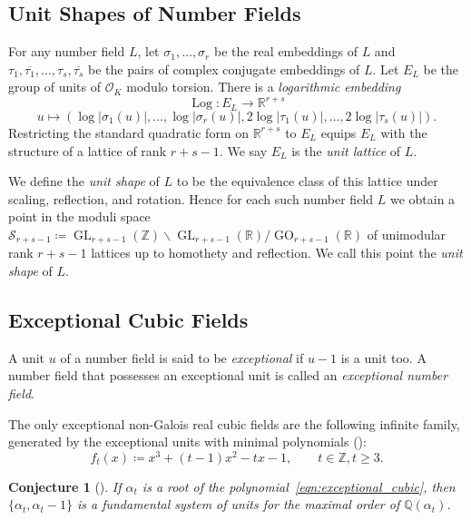 \documentclass[11pt]{amsart}
\numberwithin{equation}{section}
\newtheorem{conjecture}[algorithm]{Conjecture}
\theoremstyle{definition}
\newcommand{\RR}{\mathbb{R}}
\newcommand{\ZZ}{\mathbb{Z}}
\newcommand{\QQ}{\mathbb{Q}}
\newcommand{\cO}{\mathcal{O}}
\DeclareMathOperator{\Log}{Log}
\DeclareMathOperator{\GO}{GO}
\DeclareMathOperator{\GL}{GL}
\begin{document}
\subsection{Unit Shapes of Number Fields}

For any number field $L$, let $\sigma_1,\dots,\sigma_r$ be the real embeddings of $L$ and $\tau_1, \overline{\tau_1},\dots, \tau_s, \overline{\tau_s}$ be the pairs of complex conjugate embeddings of $L$. Let $E_L$ be the group of units of $\cO_K$ modulo torsion. There is a \emph{logarithmic embedding}
\[
    \Log \colon E_L		  	\longrightarrow \RR^{r + s}	
\]
\[
u		\mapsto (\log\lvert \sigma_1(u) \rvert, \hdots, \log\lvert\sigma_r(u)\rvert, 2\log \lvert \tau_1(u) \rvert,\hdots,2\log \lvert \tau_s(u) \rvert).
\]
Restricting the standard quadratic form on $\RR^{r+s}$ to $E_L$ equips $E_L$ with the structure of a lattice of rank $r + s - 1$. We say $E_L$ is the \emph{unit lattice} of $L$. 

We define the \emph{unit shape} of $L$ to be the equivalence class of this lattice under scaling, reflection, and rotation.  Hence for each such number field $L$ we obtain a point in the moduli space $\mathcal{S}_{r+s-1} \coloneqq \GL_{r+ s-1}(\ZZ)\backslash \GL_{r+ s-1}(\RR) / \GO_{r+ s-1}(\RR)$ of unimodular rank $r + s - 1$ lattices up to homothety and reflection. We call this point the \emph{unit shape} of $L$.


\subsection{Exceptional Cubic Fields}
 A unit $u$ of a number field is said to be \emph{exceptional} if $u-1$ is a unit too. A number field that possesses an exceptional unit is called an \emph{exceptional number field}.

The only exceptional non-Galois real cubic fields are the following infinite family, generated by the exceptional units with minimal polynomials (\cite{nagell}):
\begin{equation}
    \label{eqn:exceptional_cubic}
    f_t(x) \coloneqq x^3 + (t-1)x^2 - tx -1, \qquad t \in \ZZ, t \geq 3.
\end{equation}


\begin{conjecture}[\cite{ennola}]
    \label{conj: enola}
    If $\alpha_t$ is a root of the polynomial~\ref{eqn:exceptional_cubic}, then $\{\alpha_t, \alpha_t -1\}$ is a fundamental system of units for the maximal order of $\QQ(\alpha_t)$.
\end{conjecture}
\end{document}
